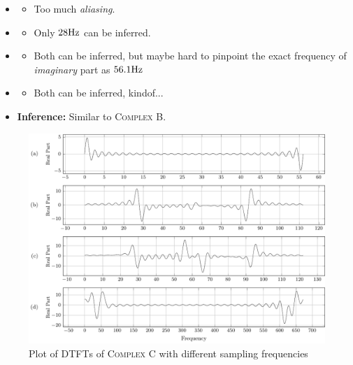 \documentclass[../../course]{subfiles}
\begin{document}
\begin{itemize} [label=]

    \item \sampFreqMuchLess
        \begin{itemize} [label=]
            \item Too much \emph{aliasing}.
        \end{itemize}

    \item \sampFreqNorm
        \begin{itemize} [label=]
            \item Only $\freqXOne \si{Hz}$ can be inferred.
        \end{itemize}

    \item \sampFreqSligGreat
        \begin{itemize} [label=]
            \item Both can be inferred, but maybe hard to pinpoint the exact frequency of \emph{imaginary}
                part as $\freqXThree \si{Hz}$
        \end{itemize}

    \item \sampFreqMuchGreat
        \begin{itemize} [label=]
            \item Both can be inferred, kindof...
        \end{itemize}

    \item \textbf{Inference:} Similar to \textsc{Complex B}.

\end{itemize}

\vfill

\begin{figure} [H]
    \centering
     {
        \includegraphics[height = 0.8\textheight] {tikzpics/plotDtftComplexC32.pdf}
    }
     {Plot of \textsc{DTFT}s of \textsc{Complex C} with different sampling frequencies}
    \label{plt:dtftComplexC}
\end{figure}
\end{document}
